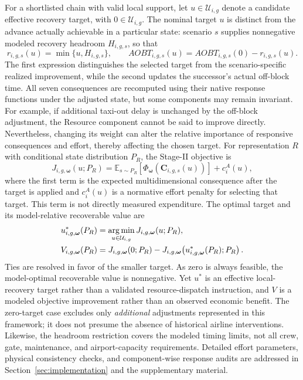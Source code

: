 For a shortlisted chain with valid local support, let $u\in\mathcal U_{i,g}$ denote a candidate effective recovery target, with $0\in\mathcal U_{i,g}$. The nominal target $u$ is distinct from the advance actually achievable in a particular state: scenario $s$ supplies nonnegative modeled recovery headroom $H_{i,g,s}$, so that
\[
r_{i,g,s}(u)=\min\{u,H_{i,g,s}\},\qquad
AOBT_{i,g,s}(u)=AOBT_{i,g,s}(0)-r_{i,g,s}(u).
\]
The first expression distinguishes the selected target from the scenario-specific realized improvement, while the second updates the successor's actual off-block time. All seven consequences are recomputed using their native response functions under the adjusted state, but some components may remain invariant. For example, if additional taxi-out delay is unchanged by the off-block adjustment, the Resource component cannot be said to improve directly. Nevertheless, changing its weight can alter the relative importance of responsive consequences and effort, thereby affecting the chosen target. For representation $R$ with conditional state distribution $P_R$, the Stage-II objective is
\begin{equation}
J_{i,g,\boldsymbol\omega}(u;P_R)
=\mathbb E_{s\sim P_R}\!\left[
\Phi_{\boldsymbol\omega}\!\left(\mathbf C_{i,g,s}(u)\right)
\right]+c_i^A(u),
\label{eq:stage2_objective_sec3}
\end{equation}
where the first term is the expected multidimensional consequence after the target is applied and $c_i^A(u)$ is a normative effort penalty for selecting that target. This term is not directly measured expenditure. The optimal target and its model-relative recoverable value are
\begin{equation}
\begin{aligned}
u^*_{i,g,\boldsymbol\omega}(P_R)
&=\operatorname*{arg\,min}_{u\in\mathcal U_{i,g}}
J_{i,g,\boldsymbol\omega}(u;P_R),\\
V_{i,g,\boldsymbol\omega}(P_R)
&=J_{i,g,\boldsymbol\omega}(0;P_R)
-J_{i,g,\boldsymbol\omega}\!\left(u^*_{i,g,\boldsymbol\omega}(P_R);P_R\right).
\end{aligned}
\label{eq:stage2_opt_sec3}
\end{equation}
Ties are resolved in favor of the smaller target. As zero is always feasible, the model-optimal recoverable value is nonnegative. Yet $u^*$ is an effective local-recovery target rather than a validated resource-dispatch instruction, and $V$ is a modeled objective improvement rather than an observed economic benefit. The zero-target case excludes only \emph{additional} adjustments represented in this framework; it does not presume the absence of historical airline interventions. Likewise, the headroom restriction covers the modeled timing limits, not all crew, gate, maintenance, and airport-capacity requirements. Detailed effort parameters, physical consistency checks, and component-wise response audits are addressed in Section~\ref{sec:implementation} and the supplementary material.

